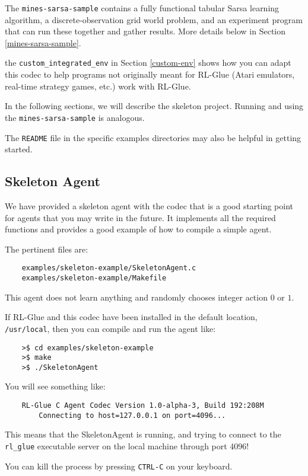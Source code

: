\documentclass[11pt]{article}
\begin{document}
The \texttt{mines-sarsa-sample} contains a fully functional tabular Sarsa learning algorithm, a discrete-observation grid world problem, and an experiment program that can run these together and gather results.  More details below in Section \ref{mines-sarsa-sample}.

the \texttt{custom\_integrated\_env} in Section \ref{custom-env} shows how you can adapt this codec to help programs not originally meant for RL-Glue (Atari emulators, real-time strategy games, etc.) work with RL-Glue.

In the following sections, we will describe the skeleton project.  Running and using the \texttt{mines-sarsa-sample} is analogous.

The \texttt{README} file in the specific examples directories may also be helpful in getting started.


\subsection{Skeleton Agent}
\label{sec:agent}
We have provided a skeleton agent with the codec that is a good starting point for agents that you may write in the future.
It implements all the required functions and provides a good example of how to compile a simple agent.

The pertinent files are:
\begin{verbatim}
	examples/skeleton-example/SkeletonAgent.c
	examples/skeleton-example/Makefile
\end{verbatim}

This agent does not learn anything and randomly chooses integer action $0$ or $1$.  

If RL-Glue and this codec have been installed in the default location, \texttt{/usr/local}, then you can compile and run the agent like:
\begin{verbatim}
	>$ cd examples/skeleton-example
	>$ make
	>$ ./SkeletonAgent
\end{verbatim}

You will see something like:
\begin{verbatim}
	RL-Glue C Agent Codec Version 1.0-alpha-3, Build 192:208M
		Connecting to host=127.0.0.1 on port=4096...
\end{verbatim}

This means that the SkeletonAgent is running, and trying to connect to the \texttt{rl\_glue} executable server on the local machine through port $4096$! 

You can kill the process by pressing \texttt{CTRL-C} on your keyboard.
\end{document}
